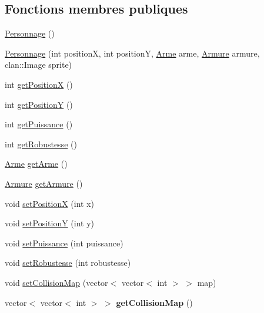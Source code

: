 \subsection*{Fonctions membres publiques}
\begin{DoxyCompactItemize}
\item 
\hyperlink{classPersonnage_abec36eb0310adc71f3375297fc590c65}{Personnage} ()
\item 
\hyperlink{classPersonnage_a35385ac425d6818de9dec2d8128004a8}{Personnage} (int position\+X, int position\+Y, \hyperlink{classArme}{Arme} arme, \hyperlink{classArmure}{Armure} armure, clan\+::\+Image sprite)
\item 
int \hyperlink{classPersonnage_ab398b805fa9060fc10b5edb00685bbbb}{get\+Position\+X} ()
\item 
int \hyperlink{classPersonnage_ab19dcfb269109b0bc74ffe0143a8cda1}{get\+Position\+Y} ()
\item 
int \hyperlink{classPersonnage_ac46ff9c905454f0e3b71097b8f75c5ea}{get\+Puissance} ()
\item 
int \hyperlink{classPersonnage_a80ff0a5dc97749f73b84dd52a4185aa4}{get\+Robustesse} ()
\item 
\hyperlink{classArme}{Arme} \hyperlink{classPersonnage_a5af967c395cfccb901fb44123c373dfa}{get\+Arme} ()
\item 
\hyperlink{classArmure}{Armure} \hyperlink{classPersonnage_af0ef6f5bf22b2b471efefbd588bf4dd6}{get\+Armure} ()
\item 
void \hyperlink{classPersonnage_ae065b66e67f3a6c5781453a156786d67}{set\+Position\+X} (int x)
\item 
void \hyperlink{classPersonnage_a757454177b4a3bff5fc641ed53824154}{set\+Position\+Y} (int y)
\item 
void \hyperlink{classPersonnage_a21ee83fd23bf612ff4fadc513c78dc94}{set\+Puissance} (int puissance)
\item 
void \hyperlink{classPersonnage_a777c12bd052992cc9ccbf1f6317433c7}{set\+Robustesse} (int robustesse)
\item 
void \hyperlink{classPersonnage_a332229cbb1b8e46808472c48e7c1f3f2}{set\+Collision\+Map} (vector$<$ vector$<$ int $>$ $>$ map)
\item 
\hypertarget{classPersonnage_ab5b419f5228f8d31de209b0245ad0d64}{}vector$<$ vector$<$ int $>$ $>$ {\bfseries get\+Collision\+Map} ()\label{classPersonnage_ab5b419f5228f8d31de209b0245ad0d64}


\end{DoxyCompactItemize}
